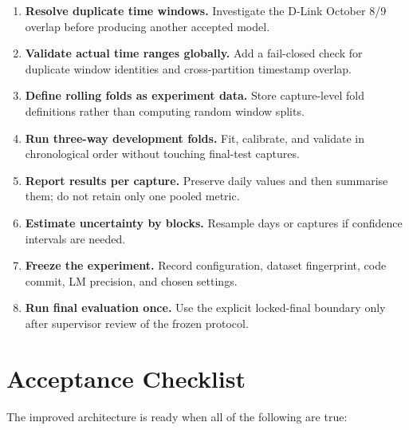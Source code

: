 \documentclass[11pt,a4paper]{article}
\begin{document}
\begin{enumerate}

\item \textbf{Resolve duplicate time windows.} Investigate the D-Link October
8/9 overlap before producing another accepted model.

\item \textbf{Validate actual time ranges globally.} Add a fail-closed check for
duplicate window identities and cross-partition timestamp overlap.

\item \textbf{Define rolling folds as experiment data.} Store capture-level
fold definitions rather than computing random window splits.

\item \textbf{Run three-way development folds.} Fit, calibrate, and validate in
chronological order without touching final-test captures.

\item \textbf{Report results per capture.} Preserve daily values and then
summarise them; do not retain only one pooled metric.

\item \textbf{Estimate uncertainty by blocks.} Resample days or captures if
confidence intervals are needed.

\item \textbf{Freeze the experiment.} Record configuration, dataset
fingerprint, code commit, LM precision, and chosen settings.

\item \textbf{Run final evaluation once.} Use the explicit locked-final
boundary only after supervisor review of the frozen protocol.

\end{enumerate}

\section{Acceptance Checklist}

The improved architecture is ready when all of the following are true:
\end{document}
